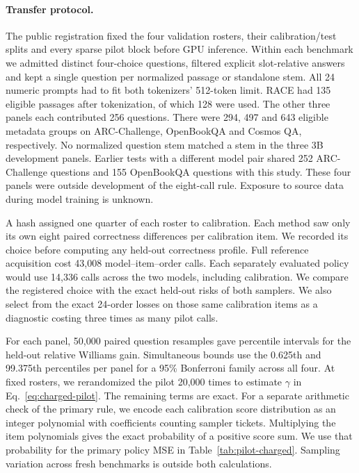 \paragraph{Transfer protocol.}
The public registration fixed the four validation rosters, their
calibration/test splits and every sparse pilot block before GPU
inference. Within each benchmark we admitted distinct four-choice
questions, filtered explicit slot-relative answers and kept a single
question per normalized passage or standalone stem. All 24 numeric
prompts had to fit both tokenizers' 512-token limit. RACE had 135
eligible passages after tokenization, of which 128 were used. The
other three panels each contributed 256 questions. There were 294,
497 and 643 eligible metadata groups on ARC-Challenge, OpenBookQA and
Cosmos QA, respectively. No normalized question stem matched a stem
in the three 3B development panels. Earlier tests with a different
model pair shared 252 ARC-Challenge questions and 155 OpenBookQA
questions with this study. These four panels were outside development
of the eight-call rule. Exposure
to source data during model training is unknown.

A hash assigned one quarter of each roster to calibration. Each
method saw only its own eight paired correctness differences per
calibration item. We recorded its choice before computing any
held-out correctness profile. Full reference acquisition cost 43,008
model--item--order calls. Each separately evaluated policy would use
14,336 calls across the two models, including calibration. We compare
the registered choice with the exact held-out risks of both samplers.
We also select from the exact 24-order losses on those same calibration
items as a diagnostic costing three times as many pilot calls.

For each panel, 50,000 paired question resamples gave percentile
intervals for the held-out relative Williams gain. Simultaneous bounds
use the 0.625th and 99.375th percentiles per panel for a 95\% Bonferroni
family across all four. At fixed rosters, we rerandomized the pilot
20,000 times to estimate $\gamma$ in Eq.~\eqref{eq:charged-pilot}.
The remaining terms are exact. For a separate arithmetic check of the primary rule, we encode each calibration score distribution as an integer polynomial with coefficients counting sampler tickets. Multiplying the item polynomials gives the exact probability of a positive score sum. We use that probability for the primary policy MSE in Table~\ref{tab:pilot-charged}. Sampling variation across fresh
benchmarks is outside both calculations.


